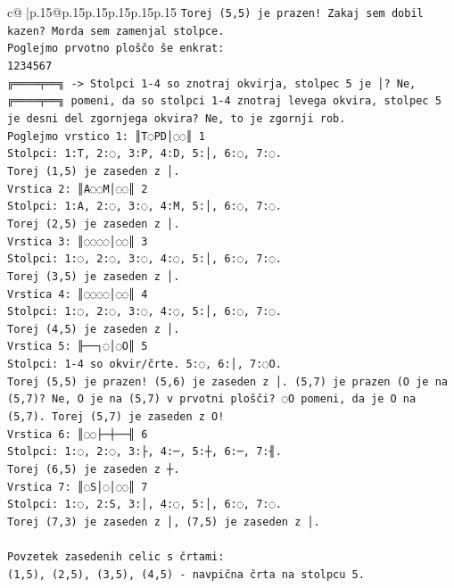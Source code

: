 \documentclass{article}
\begin{document}
{\begin{supertabular}{c@{$\;$}|p{.15\linewidth}@{}p{.15\linewidth}p{.15\linewidth}p{.15\linewidth}p{.15\linewidth}p{.15\linewidth}}
{{{\texttt{Torej (5,5) je prazen! Zakaj sem dobil kazen? Morda sem zamenjal stolpce.} \\
\texttt{Poglejmo prvotno ploščo še enkrat:} \\
\texttt{1234567} \\
\texttt{╔════╤══╗ {-}> Stolpci 1{-}4 so znotraj okvirja, stolpec 5 je │? Ne, ╔════╤══╗ pomeni, da so stolpci 1{-}4 znotraj levega okvira, stolpec 5 je desni del zgornjega okvira? Ne, to je zgornji rob.} \\
\texttt{Poglejmo vrstico 1: ║T◌PD│◌◌║ 1} \\
\texttt{Stolpci: 1:T, 2:◌, 3:P, 4:D, 5:│, 6:◌, 7:◌.} \\
\texttt{Torej (1,5) je zaseden z │.} \\
\texttt{Vrstica 2: ║A◌◌M│◌◌║ 2} \\
\texttt{Stolpci: 1:A, 2:◌, 3:◌, 4:M, 5:│, 6:◌, 7:◌.} \\
\texttt{Torej (2,5) je zaseden z │.} \\
\texttt{Vrstica 3: ║◌◌◌◌│◌◌║ 3} \\
\texttt{Stolpci: 1:◌, 2:◌, 3:◌, 4:◌, 5:│, 6:◌, 7:◌.} \\
\texttt{Torej (3,5) je zaseden z │.} \\
\texttt{Vrstica 4: ║◌◌◌◌│◌◌║ 4} \\
\texttt{Stolpci: 1:◌, 2:◌, 3:◌, 4:◌, 5:│, 6:◌, 7:◌.} \\
\texttt{Torej (4,5) je zaseden z │.} \\
\texttt{Vrstica 5: ╟──┐◌│◌O║ 5} \\
\texttt{Stolpci: 1{-}4 so okvir/črte. 5:◌, 6:│, 7:◌O.} \\
\texttt{Torej (5,5) je prazen! (5,6) je zaseden z │. (5,7) je prazen (O je na (5,7)? Ne, O je na (5,7) v prvotni plošči? ◌O pomeni, da je O na (5,7). Torej (5,7) je zaseden z O!} \\
\texttt{Vrstica 6: ║◌◌├─┼──╢ 6} \\
\texttt{Stolpci: 1:◌, 2:◌, 3:├, 4:─, 5:┼, 6:─, 7:╢.} \\
\texttt{Torej (6,5) je zaseden z ┼.} \\
\texttt{Vrstica 7: ║◌S│◌│◌◌║ 7} \\
\texttt{Stolpci: 1:◌, 2:S, 3:│, 4:◌, 5:│, 6:◌, 7:◌.} \\
\texttt{Torej (7,3) je zaseden z │, (7,5) je zaseden z │.} \\
\\ 
\texttt{Povzetek zasedenih celic s črtami:} \\
\texttt{(1,5), (2,5), (3,5), (4,5) {-} navpična črta na stolpcu 5.} \\
}}}
\end{supertabular}}
\end{document}

